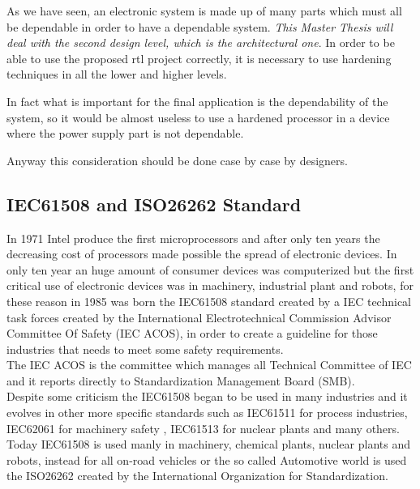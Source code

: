 {{{		
			As we have seen, an electronic system is made up of many parts which must all be dependable in order to have a dependable system. \textit{This Master Thesis will deal with the second design level, which is the architectural one}. 
			In order to be able to use the proposed rtl project correctly, it is necessary to use hardening techniques in all the lower and higher levels. 
			
			In fact what is important for the final application is the dependability of the system, so it would be almost useless to use a hardened processor in a device where the power supply part is not dependable.
			
			Anyway this consideration should be done case by case by designers. 
		
		} %
		\newpage
		\subsection{IEC61508 and ISO26262 Standard}{
			In 1971 Intel produce the first microprocessors and after only ten years the decreasing cost of processors made possible the spread of electronic devices. In only ten year an huge amount of consumer devices was computerized but the first critical use of electronic devices was in machinery, industrial plant and robots, for these reason in 1985 was born the IEC61508 standard created by a IEC technical task forces created by the International Electrotechnical Commission Advisor Committee Of Safety (IEC ACOS), in order to create a guideline for those industries that needs to meet some safety requirements.\\
	
	        The IEC ACOS is the committee which manages all Technical Committee of IEC and it reports directly to Standardization Management Board (SMB).\\
	        
		    Despite some criticism the IEC61508 began to be used in many industries and it evolves in other more specific standards such as IEC61511 for process industries, IEC62061 for machinery safety ,  IEC61513 for nuclear plants and many others. Today IEC61508 is used manly in machinery, chemical plants, nuclear plants and robots, instead for all on-road vehicles or the so called Automotive world is used the ISO26262 created by the International Organization for Standardization.\\
		    
}}}
